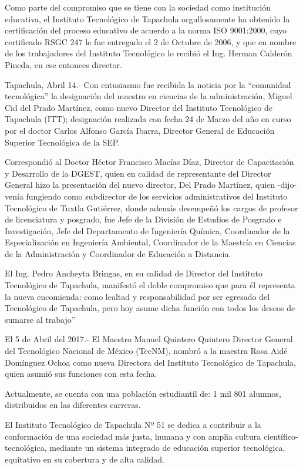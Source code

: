 Como parte del compromiso que se tiene con la sociedad como institución educativa, el Instituto Tecnológico de Tapachula orgullosamente ha obtenido la certificación del proceso educativo de acuerdo a la norma ISO 9001:2000, cuyo certificado RSGC 247 le fue entregado el 2 de Octubre de 2006, y que en nombre de los trabajadores del Instituto Tecnológico lo recibió el Ing. Herman Calderón Pineda, en ese entonces director.

Tapachula, Abril 14.- Con entusiasmo fue recibida la noticia por la “comunidad tecnológica” la designación del maestro en ciencias de la administración, Miguel Cid del Prado Martínez, como nuevo Director del Instituto Tecnológico de Tapachula (ITT); designación realizada con fecha 24 de Marzo del año en curso por el doctor Carlos Alfonso García Ibarra, Director General de Educación Superior Tecnológica de la SEP.

Correspondió al Doctor Héctor Francisco Macías Díaz, Director de Capacitación y Desarrollo de la DGEST, quien en calidad de representante del Director General hizo la presentación del nuevo director, Del Prado Martínez, quien -dijo- venía fungiendo como  subdirector de los servicios administrativos del Instituto Tecnológico de Tuxtla Gutiérrez, donde además desempeñó los cargos de profesor de licenciatura y posgrado, fue Jefe de la División de Estudios de Posgrado e Investigación, Jefe del Departamento de Ingeniería Química, Coordinador de la Especialización en Ingeniería Ambiental, Coordinador de la Maestría en Ciencias de la Administración y Coordinador de Educación a Distancia.

El Ing. Pedro Ancheyta Bringas, en su calidad de Director del Instituto Tecnológico de Tapachula, manifestó el doble compromiso que para él representa la nueva encomienda: como lealtad y responsabilidad por ser egresado del Tecnológico de Tapachula, pero hoy asume dicha función con todos los deseos de sumarse al trabajo”


El 5 de Abril del 2017.- El Maestro Manuel Quintero Quintero Director General del Tecnológico Nacional de México (TecNM), nombró a la maestra Rosa Aidé Domínguez Ochoa como nueva Directora del Instituto Tecnológico de Tapachula, quien asumió sus funciones con esta fecha.


Actualmente, se cuenta con una población estudiantil de: 1 mil 801 alumnos, distribuidos en las diferentes carreras. 

El Instituto Tecnológico de Tapachula Nº 51 se dedica a contribuir a la conformación de una sociedad más justa, humana y con amplia cultura científico-tecnológica, mediante un sistema integrado de educación superior tecnológica, equitativo en su cobertura y de alta calidad.

